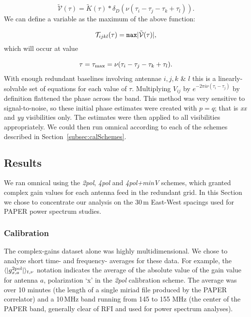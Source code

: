 \begin{equation}
\tilde{\mathcal{V}}(\tau) = \tilde{K}(\tau)*\delta_D\left(\nu (\tau_i - \tau_j - \tau_k + \tau_l)\right).
\end{equation}
We can define a variable as the maximum of the above function:

\begin{equation}
\mathcal{T}_{ijkl}(\tau) = {\tt max} | \tilde{\mathcal{V}}(\tau) |,
\end{equation}
which will occur at value 

\begin{equation}
\tau = \tau_{\rm max} = \nu (\tau_i - \tau_j - \tau_k + \tau_l).
\end{equation}
With enough redundant baselines involving antennae $i,j,k$ \& $l$ this is a linearly-solvable set of equations for each value of $\tau$. Multiplying $V_{ij}$ by $e^{-2\pi i \nu (\tau_i - \tau_j)}$ by definition flattened the phase across the band. This method was very sensitive to signal-to-noise, so these initial phase estimates were created with $p=q$; that is \textit{xx} and \textit{yy} visibilities only. The estimates were then applied to all visibilities appropriately. We could then run {\sc omnical} according to each of the schemes described in Section~\ref{subsec:calSchemes}.

\subsection{Results}
\label{sec:polcal_results}

We ran {\sc omnical} using the \textit{2pol}, \textit{4pol} and \textit{4pol+minV} schemes, which granted complex gain values for each antenna feed in the redundant grid. In this Section we chose to concentrate our analysis on the 30\,m East-West spacings used for PAPER power spectrum studies.

\subsubsection{Calibration}

The complex-gains dataset alone was highly multidimensional. We chose to analyze short time- and frequency- averages for these data. For example, the $\langle | g^{\rm 2pol}_{x,a} | \rangle_{t,\nu}$ notation indicates the average of the absolute value of the gain value for antenna $a$, polarization `x' in the \textit{2pol} calibration scheme. The average was over 10 minutes (the length of a single {\sc miriad} file produced by the PAPER correlator) and a 10\,MHz band running from 145 to 155 MHz (the center of the PAPER band, generally clear of RFI and used for power spectrum analyses).

